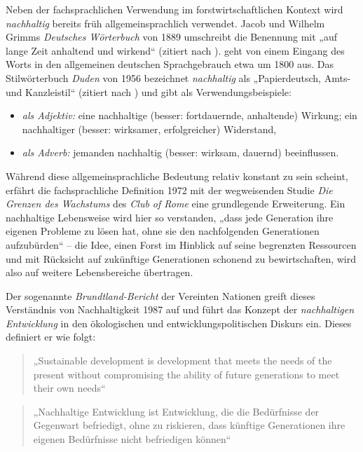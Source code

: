 \documentclass[
    german,
    a4paper,%
    12pt,%
    oneside,%
    toc=bibliography,
    final,
]{scrartcl}
\begin{document}
Neben der fachsprachlichen Verwendung im forstwirtschaftlichen Kontext wird \textit{nachhaltig} bereits früh allgemeinsprachlich verwendet. Jacob und Wilhelm Grimms \textit{Deutsches Wörterbuch} von 1889 umschreibt die Benennung mit „auf lange Zeit anhaltend und wirkend“ (zitiert nach \citealt[145]{Zürcher1965}). \citet[43]{Ninck1997} geht von einem Eingang des Worts in den allgemeinen deutschen Sprachgebrauch etwa um 1800 aus. Das Stilwörterbuch \textit{Duden} von 1956 bezeichnet \textit{nachhaltig} als „Papierdeutsch, Amts- und Kanzleistil“ (zitiert nach \citealt[145]{Zürcher1965}) und gibt als Verwendungsbeispiele:

\begin{itemize}
\item \textit{als Adjektiv:} eine nachhaltige (besser: fortdauernde, anhaltende) Wirkung; ein nachhaltiger (besser: wirksamer, erfolgreicher) Widerstand,
\item \textit{als Adverb:} jemanden nachhaltig (besser: wirksam, dauernd) beeinflussen.
\end{itemize}

Während diese allgemeinsprachliche Bedeutung relativ konstant zu sein scheint, erfährt die fachsprachliche Definition 1972 mit der wegweisenden Studie \textit{Die Grenzen des Wachstums} des \textit{Club of Rome} eine grundlegende Erweiterung. Ein nachhaltige Lebensweise wird hier so verstanden, „dass jede Generation ihre eigenen Probleme zu lösen hat, ohne sie den nachfolgenden Generationen aufzubürden“ \citep[8]{OhlmeierBrunold2015} – die Idee, einen Forst im Hinblick auf seine begrenzten Ressourcen und mit Rücksicht auf zukünftige Generationen schonend zu bewirtschaften, wird also auf weitere Lebensbereiche übertragen.

Der sogenannte \textit{Brundtland-Bericht} der Vereinten Nationen greift dieses Verständnis von Nachhaltigkeit 1987 auf und führt das Konzept der \textit{nachhaltigen Entwicklung} in den ökologischen und entwicklungspolitischen Diskurs ein. Dieses definiert er wie folgt:

\begin{quote}
„Sustainable development is development that meets the needs of the present without compromising the ability of future generations to meet their own needs“ \citep{UN1987}
\end{quote}

\begin{quote}
„Nachhaltige Entwicklung ist Entwicklung, die die Bedürfnisse der Gegenwart befriedigt, ohne zu riskieren, dass künftige Generationen ihre eigenen Bedürfnisse nicht befriedigen können“ \citep[Übersetzung durch][51]{Ninck1997}
\end{quote}
\end{document}
